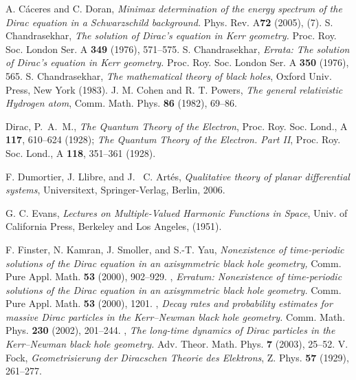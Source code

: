 \documentclass[11 pt]{article}
\renewcommand\({\left(}
\renewcommand\){\right)}
\newcommand\<{\langle}
\renewcommand\>{\rangle}
\newcommand\8{\infty}
\begin{document}
\begin{thebibliography}{10}
 \! A.\! C\'aceres\! and\! C.\! Doran,\!
  \textit{Minimax\! determination\! of\! the\! energy\! spectrum\! of\! the\! Dirac\! equation\! in\! a\! Schwarzschild\! background.}\!
  Phys.\! Rev.\! A\textbf{72}\! (2005),\! (7).
  S. Chandrasekhar,
  \textit{The solution of {D}irac's equation in {K}err geometry.}
         {Proc. Roy. Soc. London Ser. A} \textbf{349} (1976), {571--575}.
  S. Chandrasekhar,
  \textit{Errata: The solution of {D}irac's equation in {K}err geometry.}
         {Proc. Roy. Soc. London Ser. A} \textbf{350} (1976), 565.
  S. Chandrasekhar,
  \textit{The mathematical theory of black holes},
         Oxford Univ. Press, New York (1983).
  J. M. Cohen and R. T. Powers,
  \textit{The general relativistic Hydrogen atom},
         {Comm. Math. Phys.} \textbf{86} (1982), {69--86}.

  Dirac, P.~A.~M.,
  \textit{The Quantum Theory of the Electron},
  Proc. Roy. Soc. Lond., A \textbf{117}, 610--624 (1928); 
  \textit{The Quantum Theory of the Electron. Part II},
  Proc. Roy. Soc. Lond., A \textbf{118}, 351--361 (1928).  


F. %
Dumortier, 
J. %
Llibre, 
and J. %
~C. Art\'{e}s, \emph{Qualitative theory of planar differential systems}, Universitext, Springer-Verlag, Berlin, 2006.

  G. C. Evans, 
  \textit{Lectures on Multiple-Valued Harmonic Functions in Space},
         {Univ. of California Press}, {Berkeley and Los Angeles}, (1951).

  F. Finster, N. Kamran, J. Smoller, and S.-T. Yau,
  \textit{Nonexistence of time-periodic solutions of the {D}irac equation in an axisymmetric black hole geometry,}
         {Comm. Pure Appl. Math.} \textbf{53} (2000), {902--929}.
\bysame,
	  \textit{Erratum: Nonexistence of time-periodic solutions of the {D}irac equation in an axisymmetric black hole geometry.}
	  {Comm. Pure Appl. Math.} \textbf{53} (2000), {1201}.
\bysame,	  \textit{Decay rates and probability estimates for massive {D}irac
              particles in the {K}err--{N}ewman black hole geometry.}
	  {Comm. Math. Phys.} \textbf{230} (2002), {201--244}.
\bysame,
	  \textit{The long-time dynamics of {D}irac particles in the {K}err--{N}ewman black hole geometry.}
	 {Adv. Theor. Math. Phys.} \textbf{7} ({2003}), {25--52}.
 V. Fock, \textit{Geometrisierung der Diracschen Theorie des Elektrons},
  {Z. Phys.} \textbf{57} ({1929}), {261--277}.


\end{thebibliography}
\end{document}
